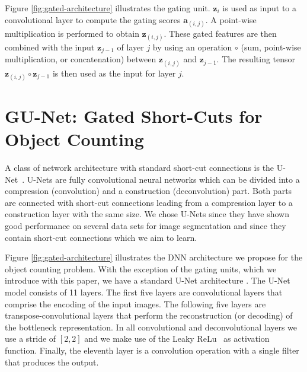 \documentclass{bmvc2k}
\def\ie{\emph{i.e}\bmvaOneDot}
\begin{document}
Figure \ref{fig:gated-architecture} illustrates the gating unit. $\boldsymbol{z}_i$ is used as input to a convolutional layer to compute the gating scores $\boldsymbol{a}_{(i,j)}$. A point-wise multiplication is performed to obtain $\boldsymbol{z}_{(i,j)}$. These gated features are then combined with the input $\boldsymbol{z}_{j-1}$ of layer $j$ by using an operation $\circ$ (sum, point-wise multiplication, or concatenation) between $\boldsymbol{z}_{(i,j)}$ and $\boldsymbol{z}_{j-1}$. The resulting tensor $\boldsymbol{z}_{(i,j)} \circ \boldsymbol{z}_{j-1}$ is then used as the input for layer $j$.

\section{GU-Net: Gated Short-Cuts for Object Counting}\label{sec:counting_model}%

A class of network architecture with standard short-cut connections is the U-Net~\cite{unetRonnebergerFB15}. U-Nets are fully convolutional neural networks which can be divided into a compression (convolution) and a construction (deconvolution) part. Both parts are connected with short-cut connections leading from a compression layer to a construction layer with the same size. We chose U-Nets since they have shown good performance on several data sets for image segmentation and since they contain short-cut connections which we aim to learn. 

Figure \ref{fig:gated-architecture} illustrates the DNN architecture we propose for the object counting problem. With the exception of the gating units, which we introduce with this paper, we have a standard U-Net architecture \cite{unetRonnebergerFB15}. The U-Net model consists of 11 layers. The first five layers are convolutional layers that comprise the encoding of the input images. The following five layers are transpose-convolutional layers \cite{Long_2015_CVPR} that perform the reconstruction (or decoding) of the bottleneck representation. In all convolutional and deconvolutional layers we use a stride of $[2,2]$ and we make use of the Leaky ReLu~\cite{andrew2013} as activation function. Finally, the eleventh layer is a convolution operation with a single filter that produces the output. 
\end{document}
